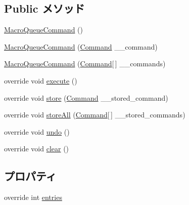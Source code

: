 \subsection*{Public メソッド}
\begin{DoxyCompactItemize}
\item 
\hyperlink{classlazurite_1_1pattern_1_1commanding_1_1_macro_queue_command_a883ecb58a4547e87deeb4bc19814f496}{MacroQueueCommand} ()
\item 
\hyperlink{classlazurite_1_1pattern_1_1commanding_1_1_macro_queue_command_a2080c08372c15eeabd8c1e858620eee5}{MacroQueueCommand} (\hyperlink{classlazurite_1_1pattern_1_1commanding_1_1_command}{Command} \_\-\_\-command)
\item 
\hyperlink{classlazurite_1_1pattern_1_1commanding_1_1_macro_queue_command_a9a95a25f0c22f251568592e3f122b7cd}{MacroQueueCommand} (\hyperlink{classlazurite_1_1pattern_1_1commanding_1_1_command}{Command}\mbox{[}$\,$\mbox{]} \_\-\_\-commands)
\item 
override void \hyperlink{classlazurite_1_1pattern_1_1commanding_1_1_macro_queue_command_a64af4fe452bfe89416ff8a4459e96d69}{execute} ()
\item 
override void \hyperlink{classlazurite_1_1pattern_1_1commanding_1_1_macro_queue_command_a35d54d52f1bfe9dccbd64f0ce9c69585}{store} (\hyperlink{classlazurite_1_1pattern_1_1commanding_1_1_command}{Command} \_\-\_\-stored\_\-command)
\item 
override void \hyperlink{classlazurite_1_1pattern_1_1commanding_1_1_macro_queue_command_aa3b1ac137d9b6f16bf2177a4b7804a23}{storeAll} (\hyperlink{classlazurite_1_1pattern_1_1commanding_1_1_command}{Command}\mbox{[}$\,$\mbox{]} \_\-\_\-stored\_\-commands)
\item 
override void \hyperlink{classlazurite_1_1pattern_1_1commanding_1_1_macro_queue_command_af5e1197135ed072c1be8c9337949e12d}{undo} ()
\item 
override void \hyperlink{classlazurite_1_1pattern_1_1commanding_1_1_macro_queue_command_a1f76eeaa709e0610212aa983cd0aaf1d}{clear} ()
\end{DoxyCompactItemize}
\subsection*{プロパティ}
\begin{DoxyCompactItemize}
\item 
override int \hyperlink{classlazurite_1_1pattern_1_1commanding_1_1_macro_queue_command_a9537c221d8cf19dbb5de28aafb334a70}{entries}
\end{DoxyCompactItemize}


